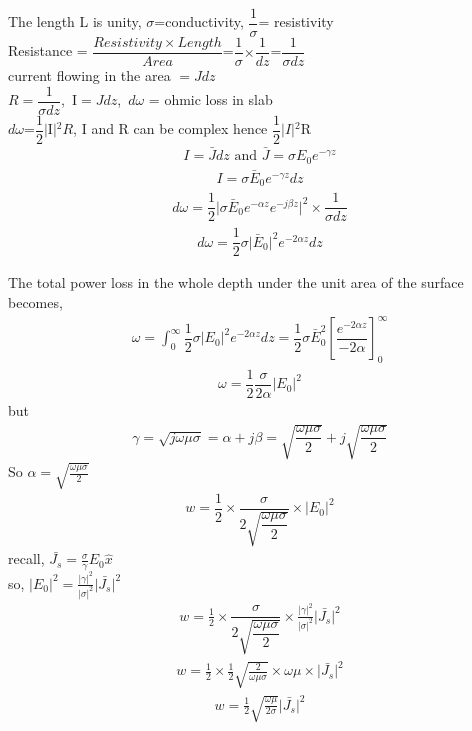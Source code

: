 \begin{center}
The length L is unity,
$\sigma$=conductivity,
$\dfrac{1}{\sigma}$= resistivity \\
Resistance = $\dfrac{Resistivity \times Length}{Area}$=$\dfrac{1}{\sigma}$$\times$$\dfrac{1}{dz}$=$\dfrac{1}{\sigma dz}$\\
current flowing in the area $=Jdz$\\
$R=\dfrac{1}{\sigma dz}$,\ I$=Jdz$,\ $d\omega$ = ohmic loss in slab \\
$d\omega$=$\dfrac{1}{2}$$\lvert$I$\rvert$$^{2}R$, 
I and R can be complex hence $\dfrac{1}{2}$$\lvert$$I\rvert$$^{2}$R
\begin{align*}
I=\bar{J}dz \text{ and } \bar{J} = \sigma E_{0} e^{-\gamma z}
\end{align*}
\begin{align*}
I=\sigma\bar{E}_{0}e^{-\gamma z}dz
\end{align*}
\begin{align*}
d\omega=\dfrac{1}{2}\lvert\sigma\bar{E}_{0}e^{-\alpha z}e^{-j\beta z}\rvert^{2}\times\dfrac{1}{\sigma dz}
\end{align*}
\begin{align*}
d\omega=\dfrac{1}{2}\sigma\lvert\bar{E}_{0}\rvert^{2}e^{-2\alpha z}dz
\end{align*}
\end{center}
The total power loss in the whole depth under the unit area of the surface becomes,
\begin{align}
\omega=\int_{0}^{\infty}\dfrac{1}{2}\sigma\lvert E_{0}\rvert^{2}e^{-2\alpha z}dz=\dfrac{1}{2}\sigma\bar{E}_{0}^{2}[\dfrac{e^{-2\alpha z}}{-2\alpha}]_{0}^{\infty}
\end{align}
\begin{align}
\omega=\dfrac{1}{2}\dfrac{\sigma}{2\alpha}\lvert E_{0}\rvert^{2}
\end{align}
but
\begin{align}
\gamma=\sqrt{j\omega\mu\sigma}=\alpha+j\beta=\sqrt{\dfrac{\omega\mu\sigma}{2}}+j\sqrt{\dfrac{\omega\mu\sigma}{2}}
\end{align}
So $\alpha = \sqrt{\frac{\omega\mu\sigma}{2}}$
\begin{align}
w = 	\dfrac{1}{2}\times\dfrac{\sigma}{2\sqrt{\dfrac{\omega\mu\sigma}{2}}}\times\lvert E_{0}\rvert^{2}
\end{align}
recall, $\bar{J_{s}} = \frac{\sigma}{\gamma}E_{0}\hat{x}$\\
so, $\lvert E_{0}\lvert^{2} = \frac{\lvert \gamma\lvert ^{2}}{\lvert \sigma\lvert^{2}}\lvert \bar{J_{s}}\lvert^{2}$
\begin{align}
	w = \frac{1}{2}\times\dfrac{\sigma}{2\sqrt{\dfrac{\omega\mu\sigma}{2}}}\times \frac{\lvert \gamma\lvert ^{2}}{\lvert \sigma\lvert^{2}}\lvert \bar{J_{s}}\lvert^{2} 
\end{align}
\begin{align*}
	w = \frac{1}{2}\times\frac{1}{2}\sqrt{\frac{2}{\omega\mu\sigma}}\times\omega\mu\times\lvert \bar{J_{s}}\lvert^{2}
\end{align*}
\begin{align}
	w = \frac{1}{2}\sqrt{\frac{\omega\mu}{2\sigma}}\lvert\bar{J_{s}}\lvert^{2}
\end{align}

